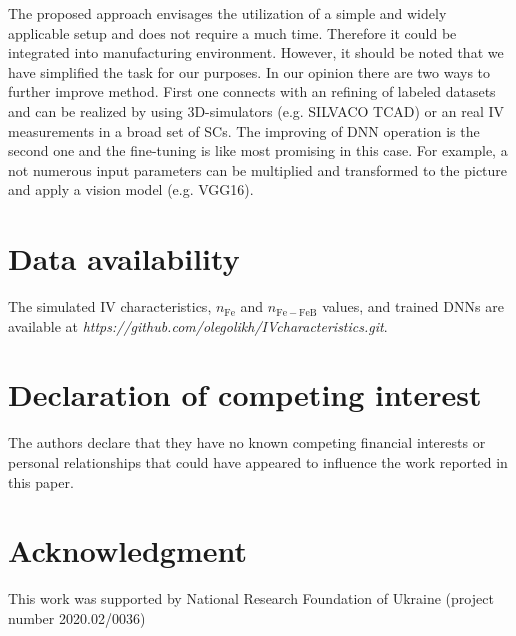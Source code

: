 \documentclass[a4paper,fleqn]{cas-sc}
\begin{document}
The proposed approach envisages 
the utilization of a simple and widely applicable setup and 
does not require a much time.
Therefore it could be integrated into manufacturing environment.
However, it should be noted that we have simplified the task for our purposes.
In our opinion there are two ways to further improve method.
First one connects with an refining of labeled datasets and can be realized by
using 3D-simulators (e.g. SILVACO TCAD) or an real IV measurements in a broad set of SCs. 
The improving of DNN operation is the second one 
and the fine-tuning is like most promising in this case. 
For example, 
a not numerous input parameters can be multiplied and transformed to the picture and 
apply a vision model (e.g. VGG16).



\printcredits

\section*{Data availability}

The simulated IV characteristics, $n_\mathrm{Fe}$ and $n_\mathrm{Fe-FeB}$ values,
and trained DNNs are available
at \newline
\emph{https://github.com/olegolikh/IVcharacteristics.git}.

\section*{Declaration of competing interest}

The authors declare that they have no known competing financial interests or personal relationships that could have appeared to influence the work reported in this paper.

\section*{Acknowledgment}


This work was supported by National Research Foundation  of Ukraine
(project number 2020.02/0036)






\end{document}
